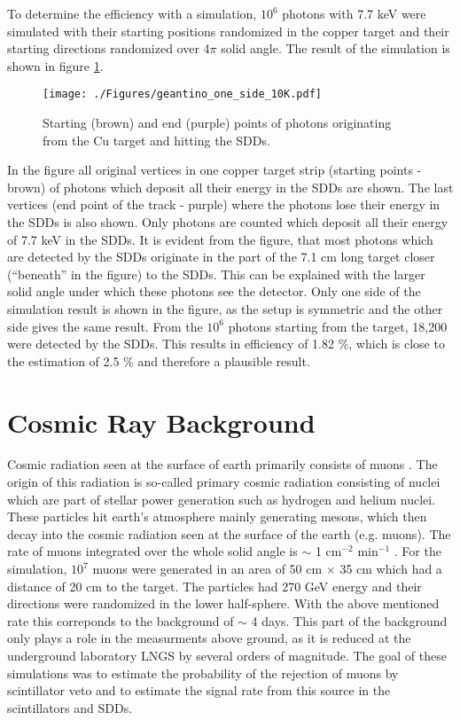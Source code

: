 To determine the efficiency with a simulation, $10^6$ photons with 7.7 keV were simulated with their starting positions randomized in the copper target and their starting directions randomized over 4$\pi$ solid angle. The result of the simulation is shown in figure \ref{fig:eff_simulation}.
\begin{figure}[h]
 \centering
 \texttt{[image: ./Figures/geantino\_one\_side\_10K.pdf]}
 \caption{Starting (brown) and end (purple) points of photons originating from the Cu target and hitting the SDDs.}
 \label{fig:eff_simulation}
\end{figure}
In the figure all original vertices in one copper target strip (starting points - brown) of photons which deposit all their energy in the SDDs are shown. The last vertices (end point of the track - purple) where the photons lose their energy in the SDDs is also shown. Only photons are counted which deposit all their energy of 7.7 keV in the SDDs. It is evident from the figure, that most photons which are detected by the SDDs originate in the part of the 7.1 cm long target closer (``beneath'' in the figure) to the SDDs. This can be explained with the larger solid angle under which these photons see the detector. Only one side of the simulation result is shown in the figure, as the setup is symmetric and the other side gives the same result. From the $10^6$ photons starting from the target, 18,200 were detected by the SDDs. This results in efficiency of 1.82 \%, which is close to the estimation of 2.5 \% and therefore a plausible result.

\section{Cosmic Ray Background}

Cosmic radiation seen at the surface of earth primarily consists of muons \cite{Gaisser2000}. The origin of this radiation is so-called primary cosmic radiation consisting of nuclei which are part of  stellar power generation such as hydrogen and helium nuclei. These particles hit earth's atmosphere mainly generating mesons, which then decay into the cosmic radiation seen at the surface of the earth (e.g. muons). The rate of muons integrated over the whole solid angle is $\sim$ 1 cm$^{-2}$ min$^{-1}$ \cite{Gaisser2000}. For the simulation, $10^{7}$ muons were generated in an area of 50 cm $\times$ 35 cm which had a distance of 20 cm to the target. The particles had 270 GeV energy and their directions were randomized in the lower half-sphere. With the above mentioned rate this correponds to the background of $\sim$ 4 days. This part of the background only plays a role in the measurments above ground, as it is reduced at the underground laboratory LNGS by several orders of magnitude. The goal of these simulations was to estimate the probability of the rejection of muons by scintillator veto and to estimate the signal rate from this source in the scintillators and SDDs.

